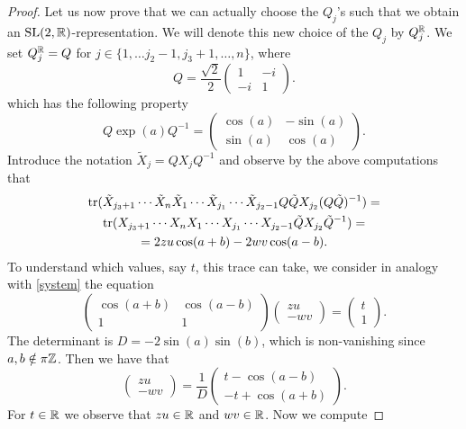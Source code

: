 \begin{proof}
Let us now prove that we can actually choose the $Q_j$'s such that we obtain an $\operatorname{SL}(2,\mathbb{R})$-representation. We will denote this new choice of the $Q_j$ by $ Q_j^{\mathbb{R}}$. We set $Q^{\mathbb{R}}_j = Q$ for $j\in \{1, \ldots j_2-1 ,j_3+1, \ldots, n\}$, where 
$$Q=\frac{\sqrt{2}}{2}\begin{pmatrix} 1& -i
\\ -i & 1
\end{pmatrix}.$$ 
which has the following property
$$ Q \exp(a) Q^{-1} = \begin{pmatrix} \cos(a) & -\sin(a)
\\ \sin(a) & \cos(a)
\end{pmatrix}.$$
Introduce the notation $\tilde X_j = Q X_j Q^{-1}$ and observe by the above computations that
\begin{multline}
\operatorname{tr}(\tilde X_{{j_3}+1}\cdots \tilde X_n \tilde X_1\cdots \tilde X_{j_1} \cdots \tilde X_{j_2-1}Q \tilde QX_{j_2}(Q\tilde Q)^{-1}) =
\\ \operatorname{tr}(X_{{j_3}+1}\cdots X_n X_1\cdots X_{j_1} \cdots X_{j_2-1} \tilde QX_{j_2}\tilde Q^{-1}) =
\\ =2zu\cos(a+b)-2wv\cos(a-b).
\end{multline}
To understand which values, say $t$, this trace can take, we consider in analogy with \eqref{system} the equation
\begin{equation} \label{system2}
\begin{pmatrix} \cos(a+b) & \cos(a-b)
\\ 1 & 1
\end{pmatrix} \begin{pmatrix} zu \\ -wv \end{pmatrix}=\begin{pmatrix} t \\ 1 \end{pmatrix}.
\end{equation}
The determinant is $D = -2\sin(a)\sin(b)$, which is non-vanishing since $a,b\notin \pi \mathbb{Z}$. Then we have that
\begin{equation} \label{system3}
\begin{pmatrix} zu \\ -wv \end{pmatrix} = \frac1D \begin{pmatrix} t - \cos(a-b) \\ -t+\cos(a+b) \end{pmatrix}.
\end{equation}
For $t\in \mathbb{R}$ we observe that $zu\in \mathbb{R}$ and $wv\in \mathbb{R}$. Now we compute

\end{proof}
